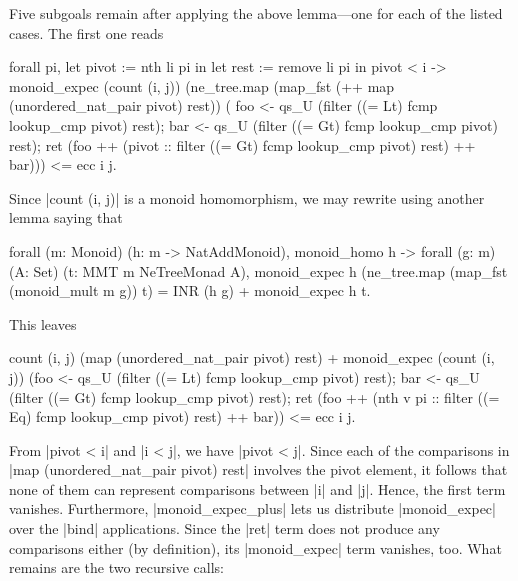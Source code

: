 \documentclass[runningheads]{llncs}
\begin{document}
Five subgoals remain after applying the above lemma---one for each of the listed cases. The first one reads
\begin{code}
  forall pi,
    let pivot := nth li pi in
    let rest := remove li pi in
      pivot < i ->
      monoid_expec (count (i, j))
        (ne_tree.map (map_fst (++ map (unordered_nat_pair pivot) rest)) (
          foo <- qs_U (filter ((= Lt) fcmp lookup_cmp pivot) rest);
          bar <- qs_U (filter ((= Gt) fcmp lookup_cmp pivot) rest);
          ret (foo ++ (pivot :: filter ((= Gt) fcmp lookup_cmp pivot) rest) ++ bar)))
        <= ecc i j.
  \end{code}
Since |count (i, j)| is a monoid homomorphism, we may rewrite using another lemma saying that
\begin{code}
  forall (m: Monoid) (h: m -> NatAddMonoid), monoid_homo h ->
  forall (g: m) (A: Set) (t: MMT m NeTreeMonad A),
    monoid_expec h (ne_tree.map (map_fst (monoid_mult m g)) t) =
    INR (h g) + monoid_expec h t.
\end{code}
This leaves
\begin{code}
    count (i, j) (map (unordered_nat_pair pivot) rest) +
    monoid_expec (count (i, j))
      (foo <- qs_U (filter ((= Lt) fcmp lookup_cmp pivot) rest);
      bar <- qs_U (filter ((= Gt) fcmp lookup_cmp pivot) rest);
      ret  (foo ++ (nth v pi :: filter ((= Eq) fcmp lookup_cmp pivot) rest) ++ bar))
    <= ecc i j.
\end{code}
From |pivot < i| and |i < j|, we have |pivot < j|. Since each of the comparisons in |map (unordered_nat_pair pivot) rest| involves the pivot element, it follows that none of them can represent comparisons between |i| and |j|. Hence, the first term vanishes. Furthermore, |monoid_expec_plus| lets us distribute |monoid_expec| over the |bind| applications. Since the |ret| term does not produce any comparisons either (by definition), its |monoid_expec| term vanishes, too. What remains are the two recursive calls:
\end{document}
